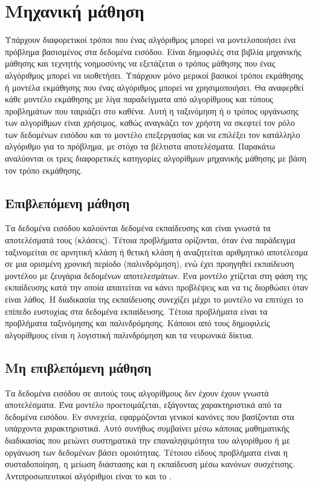 \section{Μηχανική μάθηση}
Υπάρχουν διαφορετικοί τρόποι που ένας αλγόριθμος μπορεί να μοντελοποιήσει ένα πρόβλημα βασισμένος στα δεδομένα εισόδου. Είναι δημοφιλές στα βιβλία μηχανικής μάθησης και τεχνητής νοημοσύνης να εξετάζεται ο τρόπος μάθησης που ένας αλγόριθμος μπορεί να υιοθετήσει. Υπάρχουν μόνο μερικοί βασικοί τρόποι εκμάθησης ή μοντέλα εκμάθησης που ένας αλγόριθμος μπορεί να χρησιμοποιήσει. Θα αναφερθεί κάθε μοντέλο εκμάθησης με λίγα παραδείγματα από αλγορίθμους και τύπους προβλημάτων που ταιριάζει στο καθένα. Αυτή η ταξινόμηση ή ο τρόπος οργάνωσης των αλγορίθμων είναι χρήσιμος, καθώς αναγκάζει τον χρήστη να σκεφτεί τον ρόλο των δεδομένων εισόδου και το μοντέλο επεξεργασίας και να επιλέξει τον κατάλληλο αλγόριθμο για το πρόβλημα, με στόχο τα βέλτιστα αποτελέσματα. Παρακάτω αναλύονται οι τρεις διαφορετικές κατηγορίες αλγορίθμων μηχανικής μάθησης με βάση τον τρόπο εκμάθησης.
\subsection{Επιβλεπόμενη μάθηση}
Τα δεδομένα εισόδου καλούνται δεδομένα εκπαίδευσης και είναι γνωστά τα αποτελέσματά τους (κλάσεις). Τέτοια προβλήματα ορίζονται, όταν ένα παράδειγμα ταξινομείται σε αρνητική κλάση ή θετική κλάση ή αναζητείται αριθμητικό αποτέλεσμα σε μια ορισμένη χρονική περίοδο (παλινδρόμηση), ενώ έχει προηγηθεί εκπαίδευση μοντέλου με ζευγάρια δεδομένων αποτελεσμάτων. Ένα μοντέλο χτίζεται στη φάση της εκπαίδευσης κατά την οποία απαιτείται να κάνει προβλέψεις και να τις διορθώσει όταν είναι λάθος. Η διαδικασία της εκπαίδευσης συνεχίζει μέχρι το μοντέλο να επιτύχει το επίπεδο ευστοχίας στα δεδομένα εκπαίδευσης. Τέτοια προβλήματα είναι τα προβλήματα ταξινόμησης και παλινδρόμησης. Κάποιοι από τους δημοφιλείς αλγορίθμους είναι η λογιστική παλινδρόμηση και τα νευρωνικά δίκτυα.
\subsection{Μη επιβλεπόμενη μάθηση}
Τα δεδομένα εισόδου σε αυτούς τους αλγορίθμους δεν έχουν έχουν γνωστά αποτελέσματα. Ένα μοντέλο προετοιμάζεται, εξάγοντας χαρακτηριστικά από τα δεδομένα εισόδου. Εν συνεχεία, εφαρμόζονται γενικοί κανόνες που βασίζονται στα υπάρχοντα χαρακτηριστικά. Αυτό συνήθως συμβαίνει μέσω κάποιας μαθηματικής διαδικασίας που μειώνει συστηματικά την επαναληψιμότητα του αλγορίθμου ή με οργάνωση των δεδομένων βάσει ομοιότητας. Τέτοιου είδους προβλήματα είναι η συσταδοποίηση, η μείωση διάστασης και η εκπαίδευση μέσω κανόνων συσχέτισης. Αντιπροσωπευτικοί αλγόριθμοι είναι το  και το .
